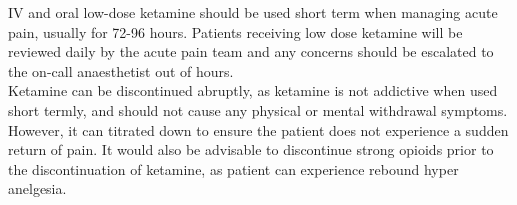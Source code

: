 \documentclass[
]{book}
\begin{document}
IV and oral low-dose ketamine should be used short term when managing acute pain, usually for 72-96 hours. Patients receiving low dose ketamine will be reviewed daily by the acute pain team and any concerns should be escalated to the on-call anaesthetist out of hours.\\
Ketamine can be discontinued abruptly, as ketamine is not addictive when used short termly, and should not cause any physical or mental withdrawal symptoms. However, it can titrated down to ensure the patient does not experience a sudden return of pain. It would also be advisable to discontinue strong opioids prior to the discontinuation of ketamine, as patient can experience rebound hyper anelgesia.

  
\end{document}
